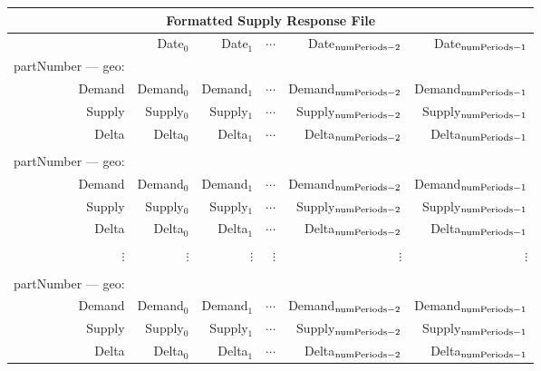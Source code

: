 \begin{tabular}{rrrrrr}
\multicolumn{6}{c}{{\bf Formatted Supply Response File}}\\ \hline\hline
  & Date$_0$ & Date$_1$ & $\cdots$ & Date$_{{\rm numPeriods} - 2}$ 
             & Date$_{{\rm numPeriods} - 1}$ \\
partNumber --- geo: \\
Demand & Demand$_0$ & Demand$_1$ & $\cdots$ & Demand$_{{\rm numPeriods} - 2}$ 
             & Demand$_{{\rm numPeriods} - 1}$ \\
Supply & Supply$_0$ & Supply$_1$ & $\cdots$ & Supply$_{{\rm numPeriods} - 2}$ 
             & Supply$_{{\rm numPeriods} - 1}$ \\
Delta & Delta$_0$ & Delta$_1$ & $\cdots$ & Delta$_{{\rm numPeriods} - 2}$ 
             & Delta$_{{\rm numPeriods} - 1}$ \\
\\
partNumber --- geo: \\
Demand & Demand$_0$ & Demand$_1$ & $\cdots$ & Demand$_{{\rm numPeriods} - 2}$ 
             & Demand$_{{\rm numPeriods} - 1}$ \\
Supply & Supply$_0$ & Supply$_1$ & $\cdots$ & Supply$_{{\rm numPeriods} - 2}$ 
             & Supply$_{{\rm numPeriods} - 1}$ \\
Delta & Delta$_0$ & Delta$_1$ & $\cdots$ & Delta$_{{\rm numPeriods} - 2}$ 
             & Delta$_{{\rm numPeriods} - 1}$ \\
\\
$\vdots $ & $\vdots $ & $\vdots $ & $\vdots $ & $\vdots $ & $\vdots $ \\
\\
partNumber --- geo: \\
Demand & Demand$_0$ & Demand$_1$ & $\cdots$ & Demand$_{{\rm numPeriods} - 2}$ 
             & Demand$_{{\rm numPeriods} - 1}$ \\
Supply & Supply$_0$ & Supply$_1$ & $\cdots$ & Supply$_{{\rm numPeriods} - 2}$ 
             & Supply$_{{\rm numPeriods} - 1}$ \\
Delta & Delta$_0$ & Delta$_1$ & $\cdots$ & Delta$_{{\rm numPeriods} - 2}$ 
             & Delta$_{{\rm numPeriods} - 1}$ 
\end{tabular}


